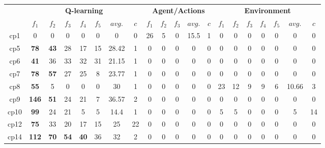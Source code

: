 \setlength{\tabcolsep}{4pt}
\begin{tabular*}{\linewidth}{ @{\extracolsep{\fill}}c | ccccccc | ccccc | ccccccc @{}}
\toprule
& \multicolumn{7}{|c|}{\textbf{Q-learning}} & \multicolumn{5}{c|}{\textbf{Agent/Actions}} & \multicolumn{7}{c}{\textbf{Environment}} \\

& $f_1$ & $f_2$  & $f_3$  & $f_4$ & $f_5$ & $avg.$ & $c$ 
& $f_1$ & $f_2$  & $f_3$  & $avg.$ & $c$
& $f_1$ & $f_2$  & $f_3$  & $f_4$ & $f_5$ & $avg.$ & $c$  \\
\midrule

cp1 &  0 & 0  &  0  &  0  &  0 &  0  &  0 
     & 26 & 5  &  0  &  15.5  &  1   
    &  0 & 0  &  0  &  0  &  0 &  0  &  0  \\

cp5 &  \textbf{{\color{red}78}} & \textbf{{\color{red}43}}  &  28  &  17  &  15 &  28.42 &  1
    & 0 & 0  &  0  &  0  &  0   
    &  0 & 0  &  0  &  0  &  0 &  0  &  0  \\

cp6 &  \textbf{{\color{red}41}} & 36  &  33  &  32  &  31 &  21.15  &  1 
     & 0 & 0  &  0  &  0  &  0   
     &  0 & 0  &  0  &  0  &  0 &  0  &  0  \\

cp7 &  \textbf{{\color{red}78}} & \textbf{{\color{red}57}}  &  27  &  25  &  8 &  23.77  &  1 
    & 0 & 0  &  0  &  0  &  0   
    &  0 & 0  &  0  &  0  &  0 &  0  &  0  \\

cp8 &  \textbf{{\color{red}55}} & 5  &  0  &  0  &  0 &  30  &  1 
    & 0 & 0  &  0  &  0  &  0 
    & 23 & 12  &  9 & 9 & 6 &  10.66  &  3  \\

cp9 &  \textbf{{\color{red}146}} & \textbf{{\color{red}51}} &  24  &  21  &  7 &  36.57  &  2 
     & 0 & 0  &  0  &  0  &  0   
    &  0 & 0  &  0  &  0  &  0 &  0  &  0  \\

cp10 &  \textbf{{\color{red}99}} & 24  &  21  &  5  &  5 &  14.4 &  1 
     & 0 & 0  &  0  &  0  &  0   
    &  5 & 5  &  0  &  0  &  0 &  5  &  14  \\

cp12 &  \textbf{{\color{red}75}} & 33  &  20  &  17  &  15 &  25  &  22 
     & 0 & 0  &  0  &  0  &  0   
    &  0 & 0  &  0  &  0  &  0 &  0  &  0  \\

cp14 &  \textbf{{\color{red}112}} & \textbf{{\color{red}70}}  &  \textbf{{\color{red}54}}  &  \textbf{{\color{red}40}}  &  36 &  32  &  2 
    & 0 & 0  &  0  &  0  &  0   
    &  0 & 0  &  0  &  0  &  0 &  0  &  0  \\  


\end{tabular*}
